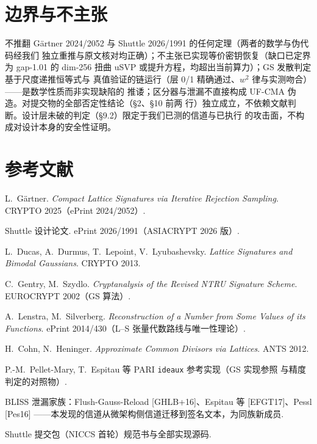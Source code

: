\documentclass[UTF8,11pt,a4paper]{ctexart}
\newcommand{\code}[1]{\texttt{\small #1}}
\begin{document}
\section{边界与不主张}

不推翻 G\"artner 2024/2052 与 Shuttle 2026/1991 的任何定理（两者的数学与伪代码经我们
独立重推与原文核对均正确）；不主张已实现等价密钥恢复（缺口已定界为 gap-1.01 的
dim-256 扭曲 uSVP 或提升方程，均超出当前算力）；GS 发散判定基于尺度递推恒等式与
真值验证的链运行（层 0/1 精确通过、$w^2$ 律与实测吻合）——是数学性质而非实现缺陷的
推诿；区分器与泄漏不直接构成 UF-CMA 伪造。对提交物的全部否定性结论（\S2、\S10 前两
行）独立成立，不依赖文献判断。设计层未破的判定（\S9.2）限定于我们已测的信道与已执行
的攻击面，不构成对设计本身的安全性证明。

\section*{参考文献}
\begin{enumerate}[label={[\arabic*]}]
\item L.~G\"artner. \emph{Compact Lattice Signatures via Iterative Rejection Sampling}.
  CRYPTO 2025（ePrint 2024/2052）.
\item Shuttle 设计论文. ePrint 2026/1991（ASIACRYPT 2026 版）.
\item L.~Ducas, A.~Durmus, T.~Lepoint, V.~Lyubashevsky. \emph{Lattice Signatures and
  Bimodal Gaussians}. CRYPTO 2013.
\item C.~Gentry, M.~Szydlo. \emph{Cryptanalysis of the Revised NTRU Signature Scheme}.
  EUROCRYPT 2002（GS 算法）.
\item A.~Lenstra, M.~Silverberg. \emph{Reconstruction of a Number from Some Values of
  its Functions}. ePrint 2014/430（L--S 张量代数路线与唯一性理论）.
\item H.~Cohn, N.~Heninger. \emph{Approximate Common Divisors via Lattices}. ANTS 2012.
\item P.-M.~Pellet-Mary, T.~Espitau 等 PARI \code{ideaux} 参考实现（GS 实现参照
  与精度判定的对照物）.
\item BLISS 泄漏家族：Flush-Gauss-Reload [GHLB+16]、Espitau 等 [EFGT17]、Pessl [Pes16]
  ——本发现的信道从微架构侧信道迁移到签名文本，为同族新成员.
\item Shuttle 提交包（NICCS 首轮）规范书与全部实现源码.
\end{enumerate}
\end{document}
